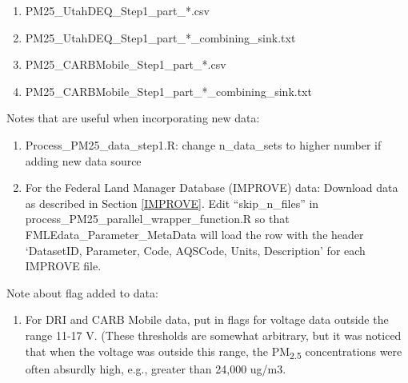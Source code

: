 \begin{enumerate}[nolistsep]
\begin{enumerate}[nolistsep]
\item PM25\_UtahDEQ\_Step1\_part\_*.csv
\item PM25\_UtahDEQ\_Step1\_part\_*\_combining\_sink.txt
\item PM25\_CARBMobile\_Step1\_part\_*.csv
\item PM25\_CARBMobile\_Step1\_part\_*\_combining\_sink.txt
\end{enumerate}
\medskip
Notes that are useful when incorporating new data:
\begin{enumerate}
\item Process\_PM25\_data\_step1.R: change n\_data\_sets to higher number if adding new data source
\item For the Federal Land Manager Database (IMPROVE) data: Download data as described in Section \ref{IMPROVE}. Edit ``skip\_n\_files'' in process\_PM25\_parallel\_wrapper\_function.R so that FMLEdata\_Parameter\_MetaData will load the row with the header `DatasetID, Parameter, Code, AQSCode, Units, Description' for each IMPROVE file.
\end{enumerate}

Note about flag added to data:

	\begin{enumerate}
	\item For DRI and CARB Mobile data, put in flags for voltage data outside the range 11-17 V. (These thresholds are somewhat arbitrary, but it was noticed that when the voltage was outside this range, the PM\textsubscript{2.5} concentrations were often absurdly high, e.g., greater than 24,000 ug/m3.
	\end{enumerate}



\end{enumerate}
